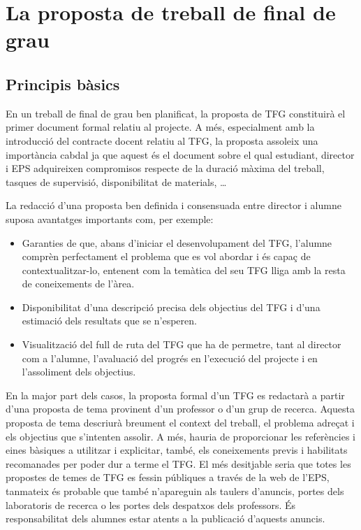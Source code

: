 
\chapter{La proposta de treball de final de grau}\label{proposta}

\section{Principis bàsics}
En un treball de final de grau ben planificat, la proposta de \ac{TFG} constituirà el primer document formal relatiu al projecte. A més, especialment amb la introducció del contracte docent relatiu al \ac{TFG}, la proposta assoleix una importància cabdal ja que aquest és el document sobre el qual estudiant, director i \ac{EPS} adquireixen compromisos respecte de la duració màxima del treball, tasques de supervisió, disponibilitat de materials, \ldots

La redacció d'una proposta ben definida i consensuada entre director i alumne suposa avantatges importants com, per exemple:
\begin{itemize}
\item Garanties de que, abans d'iniciar el desenvolupament del \ac{TFG}, l'alumne comprèn perfectament el problema que es vol abordar i és capaç de contextualitzar-lo, entenent com la temàtica del seu \ac{TFG} lliga amb la resta de coneixements de l'àrea.

\item Disponibilitat d'una descripció precisa dels objectius del \ac{TFG} i d'una estimació dels resultats que se n'esperen.

\item Visualització del full de ruta del \ac{TFG} que ha de permetre, tant al director com a l'alumne, l'avaluació del progrés en l'execució del projecte i en l'assoliment dels objectius.
\end{itemize}

En la major part dels casos, la proposta formal d'un \ac{TFG} es redactarà a partir d'una proposta de tema provinent d'un professor o d'un grup de recerca. Aquesta proposta de tema descriurà breument el context del treball, el problema adreçat i els objectius que s'intenten assolir. A més, hauria de proporcionar les referències i eines bàsiques a utilitzar i explicitar, també, els coneixements previs i habilitats recomanades per poder dur a terme el \ac{TFG}. El més desitjable seria que totes les propostes de temes de \ac{TFG} es fessin públiques a través de la web de l'\ac{EPS}, tanmateix és probable que també n'apareguin als taulers d'anuncis, portes dels laboratoris de recerca o les portes dels despatxos dels professors. És responsabilitat dels alumnes estar atents a la publicació d'aquests anuncis.

